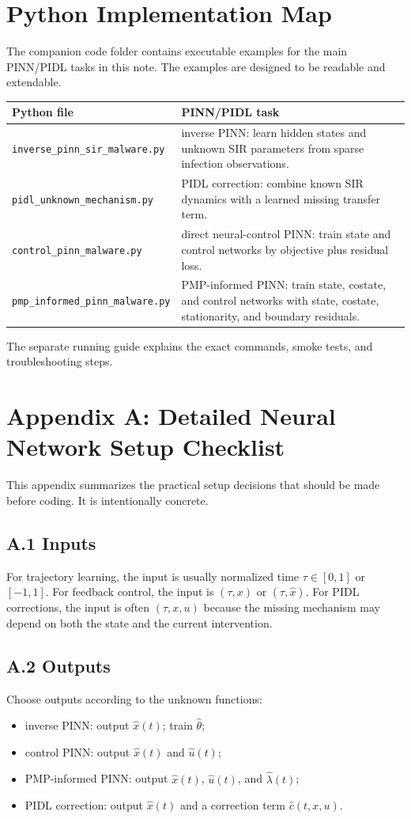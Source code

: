 \documentclass[11pt,a4paper]{article}
\begin{document}
\newpage

\section{Python Implementation Map}
The companion code folder contains executable examples for the main PINN/PIDL tasks in this note.  The examples are designed to be readable and extendable.
\begin{longtable}{p{}p{}}
\toprule
Python file & PINN/PIDL task \\
\midrule
\texttt{inverse\_pinn\_sir\_malware.py} & inverse PINN: learn hidden states and unknown SIR parameters from sparse infection observations. \\
\texttt{pidl\_unknown\_mechanism.py} & PIDL correction: combine known SIR dynamics with a learned missing transfer term. \\
\texttt{control\_pinn\_malware.py} & direct neural-control PINN: train state and control networks by objective plus residual loss. \\
\texttt{pmp\_informed\_pinn\_malware.py} & PMP-informed PINN: train state, costate, and control networks with state, costate, stationarity, and boundary residuals. \\
\bottomrule
\end{longtable}
The separate running guide explains the exact commands, smoke tests, and troubleshooting steps.

\appendix


\section{Appendix A: Detailed Neural Network Setup Checklist}
\label{app:nnsetup}
This appendix summarizes the practical setup decisions that should be made before coding. It is intentionally concrete.

\subsection*{A.1 Inputs}
For trajectory learning, the input is usually normalized time $\tau\in[0,1]$ or $[-1,1]$. For feedback control, the input is $(\tau,x)$ or $(\tau,\hat{x})$. For PIDL corrections, the input is often $(\tau,x,u)$ because the missing mechanism may depend on both the state and the current intervention.

\subsection*{A.2 Outputs}
Choose outputs according to the unknown functions:
\begin{itemize}[leftmargin=2em]
    \item inverse PINN: output $\hat{x}(t)$; train $\hat{\theta}$;
    \item control PINN: output $\hat{x}(t)$ and $\hat{u}(t)$;
    \item PMP-informed PINN: output $\hat{x}(t)$, $\hat{u}(t)$, and $\hat{\lambda}(t)$;
    \item PIDL correction: output $\hat{x}(t)$ and a correction term $\hat{c}(t,x,u)$.
\end{itemize}
\end{document}

